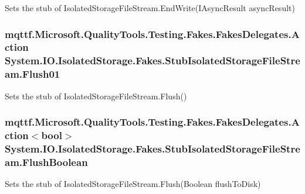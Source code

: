 Sets the stub of Isolated\-Storage\-File\-Stream.\-End\-Write(\-I\-Async\-Result async\-Result)

\hypertarget{class_system_1_1_i_o_1_1_isolated_storage_1_1_fakes_1_1_stub_isolated_storage_file_stream_a366042316f6582952721814446f96505}{
\subsubsection[{Flush01}]{\setlength{\rightskip}{0pt plus 5cm}mqttf.\-Microsoft.\-Quality\-Tools.\-Testing.\-Fakes.\-Fakes\-Delegates.\-Action System.\-I\-O.\-Isolated\-Storage.\-Fakes.\-Stub\-Isolated\-Storage\-File\-Stream.\-Flush01}}\label{class_system_1_1_i_o_1_1_isolated_storage_1_1_fakes_1_1_stub_isolated_storage_file_stream_a366042316f6582952721814446f96505}


Sets the stub of Isolated\-Storage\-File\-Stream.\-Flush()

\hypertarget{class_system_1_1_i_o_1_1_isolated_storage_1_1_fakes_1_1_stub_isolated_storage_file_stream_ace055f020367c77fa2ee973452b58f9f}{
\subsubsection[{Flush\-Boolean}]{\setlength{\rightskip}{0pt plus 5cm}mqttf.\-Microsoft.\-Quality\-Tools.\-Testing.\-Fakes.\-Fakes\-Delegates.\-Action$<$bool$>$ System.\-I\-O.\-Isolated\-Storage.\-Fakes.\-Stub\-Isolated\-Storage\-File\-Stream.\-Flush\-Boolean}}\label{class_system_1_1_i_o_1_1_isolated_storage_1_1_fakes_1_1_stub_isolated_storage_file_stream_ace055f020367c77fa2ee973452b58f9f}


Sets the stub of Isolated\-Storage\-File\-Stream.\-Flush(\-Boolean flush\-To\-Disk)

